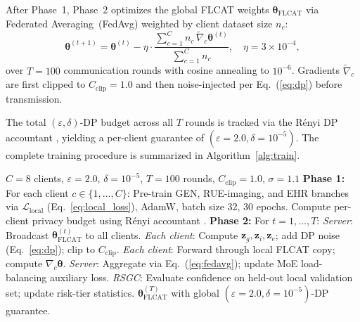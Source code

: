 \documentclass[a4paper,fleqn]{cas-dc}
\begin{document}
After Phase~1, Phase~2 optimizes the global FLCAT weights
$\boldsymbol{\theta}_{\mathrm{FLCAT}}$ via Federated Averaging~(FedAvg)
\citep{mcmahan2017} weighted by client dataset size $n_c$:
\begin{equation}
\boldsymbol{\theta}^{(t+1)} = \boldsymbol{\theta}^{(t)} -
\eta\cdot\frac{\sum_{c=1}^{C}n_c\,\tilde{\nabla}_c\boldsymbol{\theta}^{(t)}}
{\sum_{c=1}^{C}n_c},\quad\eta\!=\!3\!\times\!10^{-4},
\label{eq:fedavg}
\end{equation}
over $T\!=\!100$ communication rounds with cosine annealing to $10^{-6}$.
Gradients $\tilde{\nabla}_c$ are first clipped to $C_{\mathrm{clip}}\!=\!1.0$
and then noise-injected per Eq.~(\ref{eq:dp}) before transmission.

The total $(\varepsilon,\delta)$-DP budget across all $T$ rounds is
tracked via the R\'{e}nyi DP accountant \citep{mironov2017renyi}, yielding
a per-client guarantee of $(\varepsilon\!=\!2.0,\delta\!=\!10^{-5})$.
The complete training procedure is summarized in Algorithm~\ref{alg:train}.

\begin{algorithm}[!t]
\caption{FMBM-Net Two-Phase Federated Training}
\label{alg:train}
\begin{algorithmic}[1]
\REQUIRE $C\!=\!8$ clients, $\varepsilon\!=\!2.0$, $\delta\!=\!10^{-5}$,
         $T\!=\!100$ rounds, $C_{\mathrm{clip}}\!=\!1.0$, $\sigma\!=\!1.1$
\STATE \textbf{Phase 1:} For each client $c \in \{1,\ldots,C\}$:
\STATE \quad Pre-train GEN, RUE-imaging, and EHR branches via
       $\mathcal{L}_{\mathrm{local}}$ (Eq.~\ref{eq:local_loss}),
       AdamW, batch size 32, 30 epochs.
\STATE \quad Compute per-client privacy budget using
       R\'{e}nyi accountant \citep{mironov2017renyi}.
\STATE \textbf{Phase 2:} For $t = 1, \ldots, T$:
\STATE \quad \textit{Server}: Broadcast
       $\boldsymbol{\theta}_{\mathrm{FLCAT}}^{(t)}$ to all clients.
\STATE \quad \textit{Each client}: Compute $\mathbf{z}_g, \mathbf{z}_i,
       \mathbf{z}_e$; add DP noise (Eq.~\ref{eq:dp}); clip to
       $C_{\mathrm{clip}}$.
\STATE \quad \textit{Each client}: Forward through local FLCAT copy;
       compute $\nabla_c\boldsymbol{\theta}$.
\STATE \quad \textit{Server}: Aggregate via Eq.~(\ref{eq:fedavg}); update
       MoE load-balancing auxiliary loss.
\STATE \quad \textit{RSGC}: Evaluate confidence on held-out local
       validation set; update risk-tier statistics.
\ENSURE $\boldsymbol{\theta}_{\mathrm{FLCAT}}^{(T)}$ with global
        $(\varepsilon\!=\!2.0,\delta\!=\!10^{-5})$-DP guarantee.
\end{algorithmic}
\end{algorithm}
\end{document}
